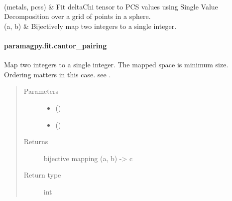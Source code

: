 \documentclass[a4paper,10pt,english]{sphinxmanual}
\begin{document}
\begin{savenotes}
\begin{longtable}{}
\\
\hline
{\hyperref[\detokenize{reference/generated/paramagpy.fit.svd_gridsearch_fit_metal_from_pcs:paramagpy.fit.svd_gridsearch_fit_metal_from_pcs}]{}}(metals, pcss)
&
Fit deltaChi tensor to PCS values using Single Value Decomposition over a grid of points in a sphere.
\\
\hline
{\hyperref[\detokenize{reference/generated/paramagpy.fit.unique_pairing:paramagpy.fit.unique_pairing}]{}}(a, b)
&
Bijectively map two integers to a single integer.
\\
\hline
\end{longtable}\sphinxatlongtableend\end{savenotes}


\paragraph{paramagpy.fit.cantor\_pairing}
\label{\detokenize{reference/generated/paramagpy.fit.cantor_pairing:paramagpy-fit-cantor-pairing}}\label{\detokenize{reference/generated/paramagpy.fit.cantor_pairing::doc}}

\begin{fulllineitems}
\label{\detokenize{reference/generated/paramagpy.fit.cantor_pairing:paramagpy.fit.cantor_pairing}}
Map two integers to a single integer.
The mapped space is minimum size.
Ordering matters in this case.
see .
\begin{quote}\begin{description}
\item[{Parameters}] \leavevmode\begin{itemize}
\item {} 
 () \textendash{} 

\item {} 
 () \textendash{} 

\end{itemize}

\item[{Returns}] \leavevmode
{} \textendash{} bijective mapping (a, b) -\textgreater{} c

\item[{Return type}] \leavevmode
int

\end{description}\end{quote}

\end{fulllineitems}
\end{document}
